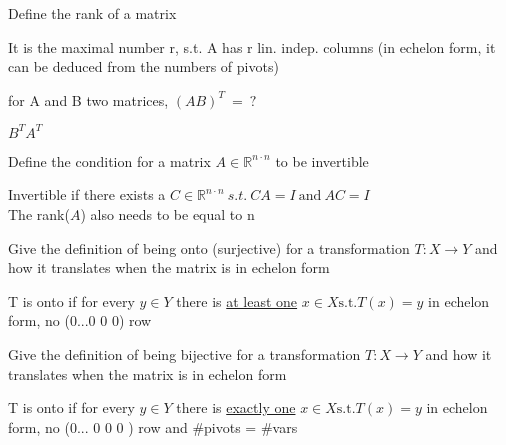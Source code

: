 \documentclass[12pt]{article}
\newcommand*{\xfield}[1]{\begin{mdframed}\centering #1\end{mdframed}\bigskip}
\newenvironment{note}{}{}
\begin{document}
\begin{note}
    \xfield{Define the rank of a matrix}
    \xfield{It is the maximal number r, s.t. A has r lin. indep. columns (in echelon form, it can be deduced from the numbers of pivots)}
\end{note}

\begin{note}
    \xfield{for A and B two matrices, \begin{math}(AB)^T\ =\ ?\end{math}}
    \xfield{\begin{math}B^TA^T\end{math}}
\end{note}

\begin{note}
    \xfield{Define the condition for a matrix \begin{math}A \in \mathbb{R}^{n\cdot n} \end{math} to be invertible}
    \xfield{Invertible if there exists a \begin{math}C \in \mathbb{R}^{n\cdot n}\ s.t.\ CA = I\ \text{and}\ AC = I\end{math}\\
    The rank($A$) also needs to be equal to n}
\end{note}

\begin{note}
    \xfield{Give the definition of being onto (surjective) for a transformation $T : X \rightarrow Y$ and how it translates when the matrix is in echelon form}
    \xfield{T is onto if for every \begin{math}y \in Y\end{math} there is \underline{at least one} \begin{math}x \in X \text{s.t.} T(x)=y\end{math} in echelon form, no (0...0 0 0) row}
\end{note}

\begin{note}
    \xfield{Give the definition of being bijective for a transformation $T : X \rightarrow Y$ and how it translates when the matrix is in echelon form}
    \xfield{T is onto if for every \begin{math}y \in Y\end{math} there is \underline{exactly one} \begin{math}x \in X \text{s.t.} T(x)=y\end{math} in echelon form, no (0... 0 0 0 ) row and \#pivots = \#vars}
\end{note}
\end{document}
